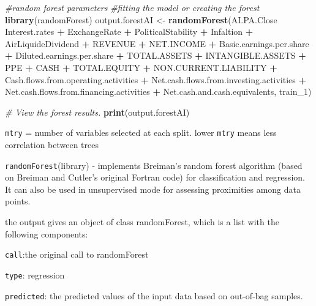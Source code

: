\documentclass[
  11pt,
]{article}
\newenvironment{Shaded}{\begin{snugshade}}{\end{snugshade}}
\newcommand{\CommentTok}[1]{\textcolor[rgb]{0.56,0.35,0.01}{\textit{#1}}}
\newcommand{\DecValTok}[1]{\textcolor[rgb]{0.00,0.00,0.81}{#1}}
\newcommand{\KeywordTok}[1]{\textcolor[rgb]{0.13,0.29,0.53}{\textbf{#1}}}
\newcommand{\NormalTok}[1]{#1}
\newcommand{\OperatorTok}[1]{\textcolor[rgb]{0.81,0.36,0.00}{\textbf{#1}}}
\newcommand{\StringTok}[1]{\textcolor[rgb]{0.31,0.60,0.02}{#1}}
\begin{document}
\begin{Shaded}
\begin{Highlighting}[]
\CommentTok{#random forest parameters}
\CommentTok{#fitting the model or creating the forest}
\KeywordTok{library}\NormalTok{(randomForest)}
\NormalTok{output.forestAI <-}\StringTok{ }\KeywordTok{randomForest}\NormalTok{(AI.PA.Close }\OperatorTok{~}\StringTok{  }\NormalTok{Interest.rates }\OperatorTok{+}\StringTok{ }
\NormalTok{ExchangeRate }\OperatorTok{+}\StringTok{ }\NormalTok{PoliticalStability }\OperatorTok{+}\StringTok{ }\NormalTok{Infaltion }\OperatorTok{+}\StringTok{ }\NormalTok{AirLiquideDividend }
\OperatorTok{+}\StringTok{ }\NormalTok{REVENUE }\OperatorTok{+}\StringTok{ }\NormalTok{NET.INCOME }\OperatorTok{+}\StringTok{ }\NormalTok{Basic.earnings.per.share }\OperatorTok{+}\StringTok{ }\NormalTok{Diluted.earnings.per.share }
\OperatorTok{+}\StringTok{ }\NormalTok{TOTAL.ASSETS  }\OperatorTok{+}\StringTok{ }\NormalTok{INTANGIBLE.ASSETS }\OperatorTok{+}\StringTok{ }\NormalTok{PPE }\OperatorTok{+}\StringTok{ }\NormalTok{CASH  }\OperatorTok{+}\StringTok{  }\NormalTok{TOTAL.EQUITY }
\OperatorTok{+}\StringTok{ }\NormalTok{NON.CURRENT.LIABILITY }\OperatorTok{+}\StringTok{ }\NormalTok{Cash.flows.from.operating.activities }\OperatorTok{+}\StringTok{ }
\NormalTok{Net.cash.flows.from.investing.activities }\OperatorTok{+}\StringTok{ }
\NormalTok{Net.cash.flows.from.financing.activities }\OperatorTok{+}\StringTok{ }
\NormalTok{Net.cash.and.cash.equivalents, train_}\DecValTok{1}\NormalTok{)}

\CommentTok{# View the forest results.}
\KeywordTok{print}\NormalTok{(output.forestAI) }
\end{Highlighting}
\end{Shaded}

\texttt{mtry} = number of variables selected at each split. lower
\texttt{mtry} means less correlation between trees

\texttt{randomForest}(library) - implements Breiman's random forest
algorithm (based on Breiman and Cutler's original Fortran code) for
classification and regression. It can also be used in unsupervised mode
for assessing proximities among data points.

the output gives an object of class randomForest, which is a list with
the following components:

\texttt{call}:the original call to randomForest

\texttt{type}: regression

\texttt{predicted}: the predicted values of the input data based on
out-of-bag samples.
\end{document}
